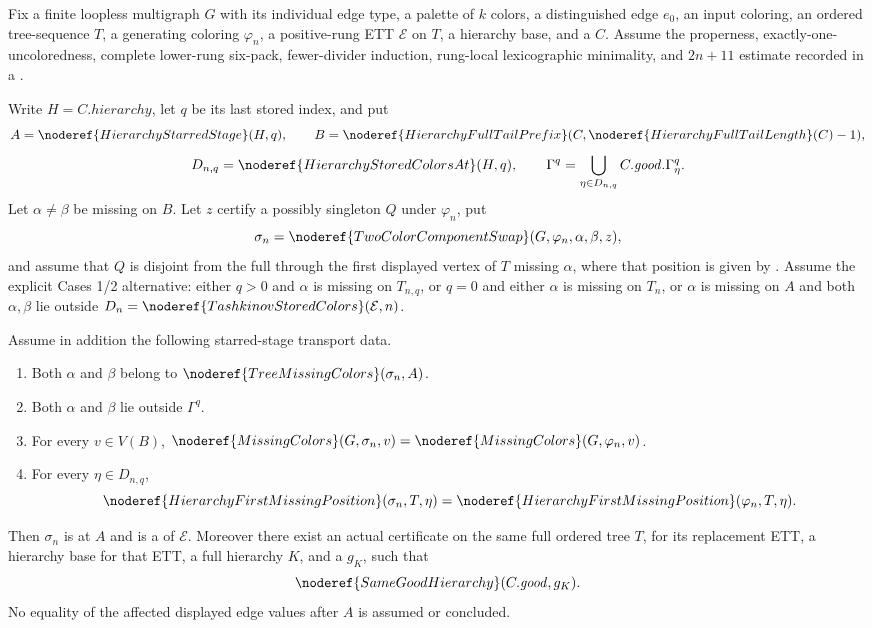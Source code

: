 \begin{lemma}
Fix a finite loopless multigraph \(G\) with its individual edge type, a
palette of \(k\) colors, a distinguished edge \(e_0\), an input coloring,
an ordered tree-sequence \(T\), a generating coloring \(\varphi_n\), a
positive-rung ETT \(\mathcal E\) on \(T\), a hierarchy base, and a
 \(C\).  Assume the properness,
exactly-one-uncoloredness, complete lower-rung six-pack, fewer-divider
induction, rung-local lexicographic minimality, and \(2n+11\) estimate
recorded in a
.

Write \(H=C.\mathit{hierarchy}\), let \(q\) be its last stored index, and
put
\[
 A=\noderef{HierarchyStarredStage}(H,q),\qquad
 B=\noderef{HierarchyFullTailPrefix}
       (C,\noderef{HierarchyFullTailLength}(C)-1),
\]
\[
 D_{n,q}=\noderef{HierarchyStoredColorsAt}(H,q),\qquad
 \Gamma^q=\bigcup_{\eta\in D_{n,q}}C.\mathit{good}.\Gamma^q_\eta .
\]
Let \(\alpha\ne\beta\) be missing on \(B\).  Let \(z\) certify a possibly
singleton  \(Q\) under \(\varphi_n\), put
\[
 \sigma_n=\noderef{TwoColorComponentSwap}
      (G,\varphi_n,\alpha,\beta,z),
\]
and assume that \(Q\) is disjoint from the full
 through the
first displayed vertex of \(T\) missing \(\alpha\), where that position is
given by .  Assume the explicit
Cases 1/2 alternative: either \(q>0\) and \(\alpha\) is missing on
\(T_{n,q}\), or \(q=0\) and either \(\alpha\) is missing on \(T_n\), or
\(\alpha\) is missing on \(A\) and both \(\alpha,\beta\) lie outside
\(D_n=\noderef{TashkinovStoredColors}(\mathcal E,n)\).

Assume in addition the following starred-stage transport data.
\begin{enumerate}
\item Both \(\alpha\) and \(\beta\) belong to
\(\noderef{TreeMissingColors}(\sigma_n,A)\).
\item Both \(\alpha\) and \(\beta\) lie outside \(\Gamma^q\).
\item For every \(v\in V(B)\),
\(\noderef{MissingColors}(G,\sigma_n,v)=
 \noderef{MissingColors}(G,\varphi_n,v)\).
\item For every \(\eta\in D_{n,q}\),
\[
 \noderef{HierarchyFirstMissingPosition}(\sigma_n,T,\eta)=
 \noderef{HierarchyFirstMissingPosition}(\varphi_n,T,\eta).
\]
\end{enumerate}

Then \(\sigma_n\) is  at \(A\) and is a
 of \(\mathcal E\).  Moreover there exist an actual
 certificate on the same full
ordered tree \(T\),  for its replacement ETT, a
hierarchy base for that ETT, a full hierarchy \(K\), and a
 \(g_K\), such that
\[
                 \noderef{SameGoodHierarchy}(C.\mathit{good},g_K).
\]
No equality of the affected displayed edge values after \(A\) is assumed
or concluded.
\end{lemma}
